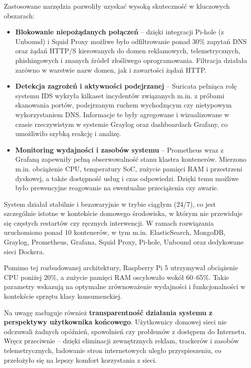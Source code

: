 \documentclass[
    left=2.5cm,         %
    right=2.5cm,        %
    top=2.5cm,          %
    bottom=3cm,         %
    bindingoffset=6mm,  %
    nohyphenation=true %
]{eiti/eiti-thesis} %
\begin{document}
Zastosowane narzędzia pozwoliły uzyskać wysoką skuteczność w kluczowych obszarach:
\begin{itemize}
    \item \textbf{Blokowanie niepożądanych połączeń} – dzięki integracji Pi-hole (z Unbound) i Squid Proxy możliwe było odfiltrowanie ponad 30\% zapytań DNS oraz żądań HTTP/S kierowanych do domen reklamowych, telemetrycznych, phishingowych i znanych źródeł złośliwego oprogramowania. Filtracja działała zarówno w warstwie nazw domen, jak i zawartości żądań HTTP.
    
    \item \textbf{Detekcja zagrożeń i aktywności podejrzanej} – Suricata pełniąca rolę systemu IDS wykryła kilkaset incydentów związanych m.in. z próbami skanowania portów, podejrzanym ruchem wychodzącym czy nietypowym wykorzystaniem DNS. Informacje te były agregowane i wizualizowane w czasie rzeczywistym w systemie Graylog oraz dashboardach Grafany, co umożliwiło szybką reakcję i analizę.

    \item \textbf{Monitoring wydajności i zasobów systemu} – Prometheus wraz z Grafaną zapewniły pełną obserwowalność stanu klastra kontenerów. Mierzono m.in. obciążenie CPU, temperatury SoC, zużycie pamięci RAM i przestrzeni dyskowej, a także dostępność usług i czas odpowiedzi. Dzięki temu możliwe było prewencyjne reagowanie na ewentualne przeciążenia czy awarie.
\end{itemize}

System działał stabilnie i bezawaryjnie w trybie ciągłym (24/7), co jest szczególnie istotne w kontekście domowego środowiska, w którym nie przewiduje się częstych restartów czy ręcznych interwencji. W ramach rozwiązania uruchomiono ponad 10 kontenerów, w tym m.in. ElasticSearch, MongoDB, Graylog, Prometheus, Grafana, Squid Proxy, Pi-hole, Unbound oraz dedykowane sieci Dockera. 

Pomimo tej rozbudowanej architektury, Raspberry Pi 5 utrzymywał obciążenie CPU poniżej 20\%, a zużycie pamięci RAM oscylowało wokół 60--65\%. Takie parametry wskazują na optymalne zrównoważenie wydajności i funkcjonalności w kontekście sprzętu klasy konsumenckiej.

Na uwagę zasługuje również \textbf{transparentność działania systemu z perspektywy użytkownika końcowego}. Użytkownicy domowej sieci nie odczuwali żadnych opóźnień, spowolnień czy problemów z dostępem do Internetu. Wręcz przeciwnie – dzięki eliminacji zewnętrznych reklam, trackerów i zasobów telemetrycznych, ładowanie stron internetowych uległo przyspieszeniu, co przełożyło się na lepszy komfort korzystania z sieci.
\end{document}
